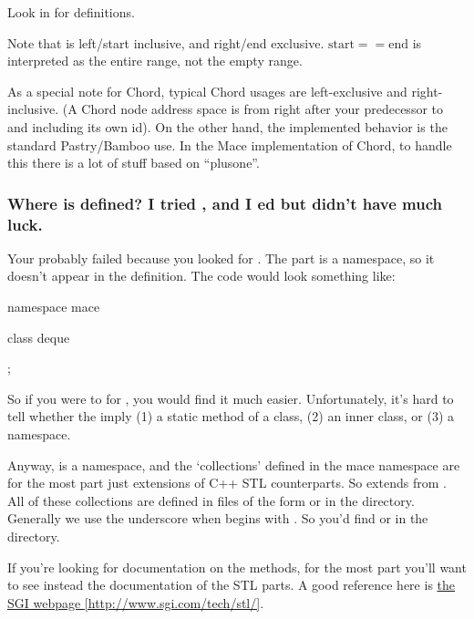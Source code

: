 Look in  for definitions.

Note that  is left/start inclusive, and right/end
exclusive.  $\mathrm{start}==\mathrm{end}$ is interpreted as the entire
range, not the empty range.

As a special note for Chord, typical Chord usages are left-exclusive and
right-inclusive.  (A Chord node address space is from right after your
predecessor to and including its own id).  On the other hand, the
implemented behavior is the standard Pastry/Bamboo use.   In the Mace
implementation of Chord, to handle this there is a lot of stuff based on
``plusone''.


\subsubsection*{Where is  defined?  I tried
, and I ed 
but didn't have much luck.}

Your  probably failed because you looked for
.  The  part is a namespace, so it
doesn't appear in the definition.  The code would look something like:

\begin{programlisting}
namespace mace {
  class deque {

  };
}
\end{programlisting}

So if you were to  for , you would
find it much easier.  Unfortunately, it's hard to tell whether the
\literal{::} imply (1) a static method of a class, (2) an inner class,
or (3) a namespace.

Anyway,  is a namespace, and the `collections' defined in
the mace namespace are for the most part just extensions of C++ STL
counterparts.  So  extends from
.  All of these collections are defined in files of
the form  or
 in the  directory.
Generally we use the underscore when  begins with
.  So you'd find  or  in
the  directory.

If you're looking for documentation on the methods, for the most part
you'll want to see instead the documentation of the STL parts.  A good
reference here is \href{http://www.sgi.com/tech/stl/}{the SGI webpage
[http://www.sgi.com/tech/stl/]}.

